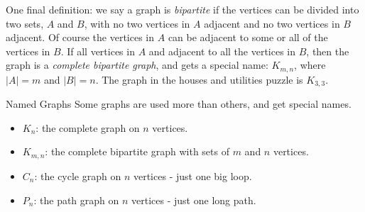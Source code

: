 \documentclass[12pt]{article}
\begin{document}
One final definition: we say a graph is {\em bipartite} if the vertices can be divided into two sets, $A$ and $B$, with no two vertices in $A$ adjacent and no two vertices in $B$ adjacent.  Of course the vertices in $A$ can be adjacent to some or all of the vertices in $B$.  If all vertices in $A$ and adjacent to all the vertices in $B$, then the graph is a {\em complete bipartite graph}, and gets a special name: $K_{m,n}$, where $|A| = m$ and $|B| = n$.  The graph in the houses and utilities puzzle is $K_{3,3}$.

\begin{defbox}{Named Graphs}
  Some graphs are used more than others, and get special names.
  \begin{itemize}
    \item $K_n$: the complete graph on $n$ vertices.
    \item $K_{m,n}$: the complete bipartite graph with sets of $m$ and $n$ vertices.
    \item $C_n$: the cycle graph on $n$ vertices - just one big loop.
    \item $P_n$: the path graph on $n$ vertices - just one long path.
  \end{itemize}
  
\def\sb{.6}
\begin{center}
\hfill
{}
\hfill
{}
\hfill
{}
\hfill
{}
\hfill
~
\end{center}
\end{defbox}
\end{document}
